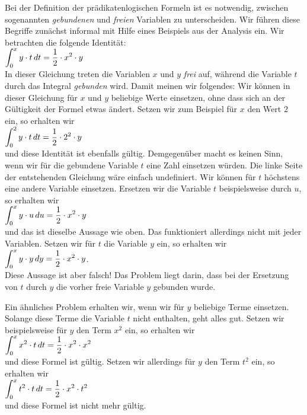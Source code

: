 \noindent
Bei der Definition der pr\"{a}dikatenlogischen Formeln ist es notwendig,
zwischen sogenannten \emph{gebundenen} und \emph{freien} Variablen zu unterscheiden.
Wir f\"{u}hren diese Begriffe zun\"{a}chst informal mit Hilfe eines Beispiels aus der Analysis ein.
Wir betrachten die folgende Identit\"{a}t: \\[0.2cm]
\hspace*{1.3cm}
 $\displaystyle\int_{0}^{x} y \cdot  t\, d t = \frac{1}{2} \cdot x^2 \cdot  y$ 
\\[0.2cm]
In dieser Gleichung treten die Variablen $x$ und $y$ \emph{frei} auf, w\"{a}hrend die Variable $t$ durch das Integral
\emph{gebunden} wird.  Damit meinen wir folgendes: Wir k\"{o}nnen in dieser Gleichung f\"{u}r $x$ und $y$ beliebige Werte
 einsetzen, ohne dass sich an der 
G\"{u}ltigkeit der Formel etwas \"{a}ndert.  Setzen wir zum Beispiel f\"{u}r $x$ den Wert $2$ ein, so erhalten wir \\[0.2cm]
\hspace*{1.3cm}
$\displaystyle\int_{0}^{2} y \cdot  t\, d t = \frac{1}{2} \cdot 2^2 \cdot  y$ \\[0.2cm]
und diese Identit\"{a}t ist ebenfalls g\"{u}ltig.  Demgegen\"{u}ber macht es keinen Sinn, wenn wir f\"{u}r die gebundene Variable
 $t$ eine Zahl einsetzen w\"{u}rden.
Die linke Seite der entstehenden Gleichung w\"{a}re einfach undefiniert.  Wir k\"{o}nnen f\"{u}r $t$
h\"{o}chstens eine andere Variable einsetzen. 
Ersetzen wir die Variable $t$ beispielsweise durch $u$, so erhalten wir \\[0.2cm]
\hspace*{1.3cm}
$\displaystyle\int_{0}^{x} y \cdot  u\, d u = \frac{1}{2} \cdot x^2 \cdot  y$ 
\\[0.2cm]
und das ist dieselbe Aussage wie oben.  Das funktioniert allerdings nicht mit jeder Variablen. Setzen wir
f\"{u}r $t$ die Variable $y$ ein, so erhalten wir \\[0.2cm]
\hspace*{1.3cm}
$\displaystyle\int_{0}^{x} y \cdot  y\, d y = \frac{1}{2} \cdot x^2 \cdot  y$. \\[0.2cm]
Diese Aussage ist aber falsch!  Das Problem liegt darin, dass bei der Ersetzung von $t$ durch $y$ die vorher freie Variable
$y$ gebunden wurde.  

Ein \"{a}hnliches Problem erhalten wir, wenn wir f\"{u}r $y$ beliebige Terme einsetzen.  Solange diese Terme die Variable $t$ 
nicht enthalten, geht alles gut.  Setzen wir beispielsweise f\"{u}r $y$  den Term $x^2$ ein, so erhalten
wir \\[0.2cm]
\hspace*{1.3cm}
$\displaystyle\int_{0}^{x} x^2 \cdot  t\, d t = \frac{1}{2} \cdot x^2 \cdot  x^2$ 
\\[0.2cm]
und diese Formel ist g\"{u}ltig.  Setzen wir allerdings f\"{u}r $y$ den Term $t^2$ ein, so erhalten wir \\[0.2cm]
\hspace*{1.3cm}
$\displaystyle\int_{0}^{x} t^2 \cdot  t\, d t = \frac{1}{2} \cdot x^2 \cdot  t^2$ 
\\[0.2cm]
und diese Formel ist nicht mehr g\"{u}ltig. 

